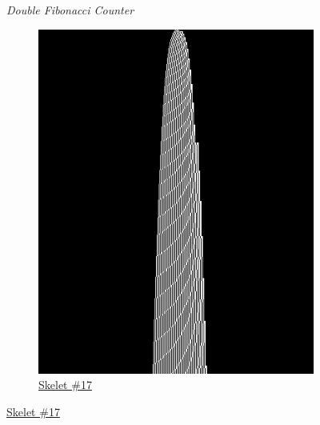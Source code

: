 \begin{figure}[h!]
\begin{minipage}{\textwidth}
{\begin{minipage}{0.3\textwidth}
                \caption*{\href{https://bbchallenge.org/1RB0RA_0LC1RA_1RE1LD_1LC0LD_---0RB}{Skelet \#10}}
                {\small\emph{Double Fibonacci Counter}}
            \end{minipage}
        }
        \hfill
        \begin{subfigure}{0.3\textwidth}
            \centering
            \includegraphics[width=\linewidth]{figures/sporadic-machines/sk17.png}
            \caption*{\href{https://bbchallenge.org/1RB---_0LC1RE_0LD1LC_1RA1LB_0RB0RA}{Skelet \#17}}
        \end{subfigure}
    \end{minipage}

    \vspace{2.5em}


\end{figure}
